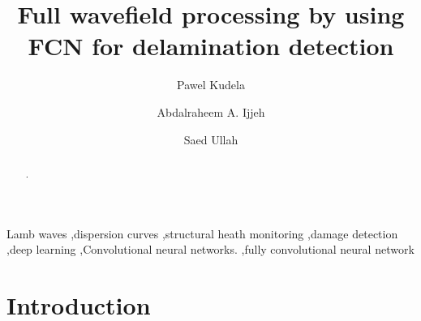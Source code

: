 \documentclass[preprint,12pt]{elsarticle}
\begin{document}
	\begin{frontmatter}
		
		\title{Full wavefield processing by using FCN for delamination detection}
		
		\address[IFFM]{Institute of Fluid Flow Machinery, Polish Academy of Sciences, Poland}
		
		\author{Pawel Kudela}
		\author{Abdalraheem A. Ijjeh}
		\author{Saed Ullah }
		
		
		\begin{abstract}
.
		\end{abstract}
		
		\begin{keyword}
			Lamb waves \sep dispersion curves \sep structural heath monitoring \sep damage detection \sep deep learning \sep Convolutional neural networks. \sep fully convolutional neural network
			
			
		\end{keyword}
		
	\end{frontmatter}
	\section{Introduction}
\end{document}
